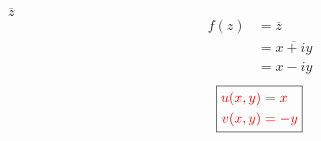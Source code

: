 \item[3.] $\overline{z}$
\begin{align*}
    f(z) 
    &= \overline{z} \\
    &= \overline{x+iy}\\
    &= x-iy
\end{align*}
\[
\boxed{
\textcolor{red}{
\begin{aligned}
u(x,y) &= x \\
v(x,y) &= -y
\end{aligned}
}
}
\]
